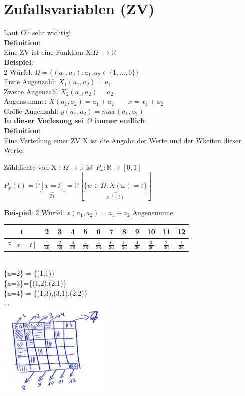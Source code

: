 \chapter{Zufallsvariablen (ZV)}
Laut Oli sehr wichtig!\medskip\\
\textbf{Definition}:\\
Eine ZV ist eine Funktion X:$\Omega$ $\rightarrow \mathbb{R}$\smallskip\\\textbf{Beispiel}:\\
2 Würfel. \hspace{1cm}$\Omega = \{(a_1,a_2): a_1,a_2 \in \{1,...,6\}\}$\medskip\\
Erste Augenzahl: $X_1(a_1,a_2)=a_1$\\
Zweite Augenzahl $X_2(a_1,a_2)=a_2$\\
Augensumme: $X(a_1,a_2) = a_1 + a_2 \qquad x = x_1 + x_2$\\
Größe Augenzahl: $y(a_1,a_2)=max(a_1,a_2)$\medskip\\
\textbf{In dieser Vorlesung sei $\Omega$ immer endlich}\medskip\\
\textbf{Definition}:\\
Eine Verteilung einer ZV X ist die Angabe der Werte und der Wkeiten dieser Werte.\smallskip\\
\begin{tabbing}
	Zähldichte von X : $\Omega \rightarrow\mathbb{R}$ ist\= $P_x:\mathbb{R}\rightarrow[0,1]$\\\>
	$P_x(t)=\mathds{P}\underbrace{[x = t]}_\text{Er.} = \mathds{P}[\underbrace{\{w \in \Omega:X(\omega)=t\}}_{x^{-1}(t)}]$
\end{tabbing}
\textbf{Beispiel}: 2 Würfel. \hspace{1cm} $x(a_1,a_2) = a_1 + a_2$ Augensumme\\
\begin{tabular}{c|c|c|c|c|c|c|c|c|c|c|c|}
	t&2&3&4&5&6&7&8&9&10&11&12\\\hline
	$\mathds{P}[x=t]$&$\frac{1}{36}$&$\frac{2}{36}$&$\frac{3}{36}$&$\frac{4}{36}$&$\frac{5}{36}$&$\frac{6}{36}$&$\frac{5}{36}$&$\frac{4}{36}$&$\frac{3}{36}$&$\frac{2}{36}$&$\frac{1}{36}$
\end{tabular}\smallskip\\
\{x=2\} = \{(1,1)\}\\
\{x=3\}=\{(1,2),(2,1)\}\\
\{x=4\} = \{(1,3),(3,1),(2,2)\}\\
...\medskip\\
\includegraphics[width=0.4\textwidth]{img/okay.PNG}\\

